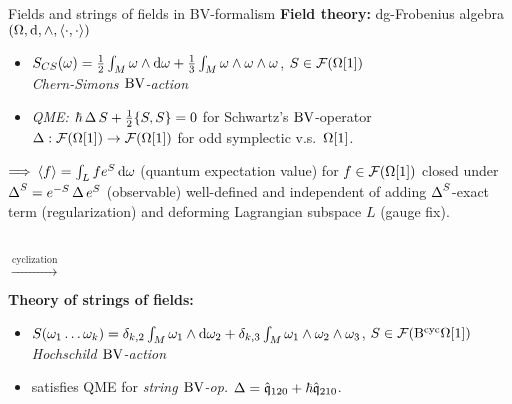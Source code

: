 \documentclass[xcolor=dvipsnames]{beamer}
\theoremstyle{plain}
\renewcommand{\emph}[1]{{\itshape\color{pink}#1}}
\newcommand{\emphbf}[1]{{\bfseries\color{YellowGreen}#1}}
\begin{document}
\begin{frame}{Fields and strings of fields in BV-formalism}
\emphbf{Field theory:}  dg-Frobenius algebra $(\Omega,\mathrm{d},\wedge,\langle\cdot,\cdot\rangle)$ 
\begin{itemize}
\item $S_{CS}(\omega) = \frac{1}{2} \int_M \omega \wedge \mathrm{d} \omega + \frac{1}{3} \int_M \omega \wedge\omega \wedge \omega$, $S\in \mathcal{F}(\Omega[1])$\\ \emph{Chern-Simons
$\mathrm{BV}$-action}
\item \emph{QME:} $\hbar \operatorname{\Delta} S + \frac{1}{2}\{S,S\} = 0$ for Schwartz's $\mathrm{BV}$-operator $\operatorname{\Delta}: \mathcal{F}(\Omega[1]) \rightarrow \mathcal{F}(\Omega[1])$ for odd symplectic v.s.~$\Omega[1]$.
\end{itemize}\pause
\vspace{.2cm}
\quad \parbox{10cm}{$\Longrightarrow$ $\langle f \rangle = \int_{L} f e^S \operatorname{d\omega}$ (quantum expectation value) for $f\in \mathcal{F}(\Omega[1])$ closed under $\operatorname{\Delta}^S = e^{-S}\operatorname{\Delta} e^{S}$ (observable) well-defined and independent of adding $\operatorname{\Delta}^S$-exact term (regularization) and deforming Lagrangian subspace $L$ (gauge fix).} \pause
\\\vspace{.2cm}
$\xrightarrow{\text{cyclization}}$\vspace{.2cm}
\\
\begin{minipage}{10cm}
\emphbf{Theory of strings of fields:}
\begin{itemize}
\item $S(\omega_1\dotsc\omega_k) = \delta_{k,2}\int_M \omega_1 \wedge \mathrm{d} \omega_2 + \delta_{k,3}\int_M \omega_1\wedge\omega_2\wedge\omega_3$, $S\in \mathcal{F}(\mathrm{B}^{\mathrm{cyc}} \Omega[1])$
\emph{Hochschild $\mathrm{BV}$-action}
\item satisfies QME for \emph{string $\mathrm{BV}$-op.}\! $\operatorname{\Delta} = \hat{\mathfrak{q}}_{120} + \hbar \hat{\mathfrak{q}}_{210}$.
\end{itemize}
\end{minipage}



\end{frame}
\end{document}
